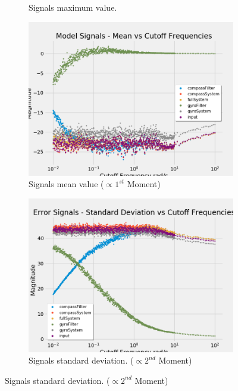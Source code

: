 \begin{figure}[H]
\begin{subfigure}{.5\textwidth}
  \caption{Signals maximum value.}
  \label{fig:model_max}
\end{subfigure}
\begin{subfigure}{.5\textwidth}
\centering
\includegraphics[width=\linewidth, height=\paperheight/5]{img/iterable/modelSignals/modelmeanSignals.png}  
  \caption{Signals mean value ($\propto1^{st}$ Moment)}
\label{fig:model_mean}
\end{subfigure}
\begin{subfigure}{.5\textwidth}
  \centering
  \includegraphics[width=\linewidth, height=\paperheight/5]{img/iterable/modelSignals/modelstandardDeviationSignals.png}  
  \caption{Signals standard deviation. ($\propto2^{nd}$ Moment)}
  \label{fig:model_standard_deviation}

\end{subfigure}
\end{figure}

